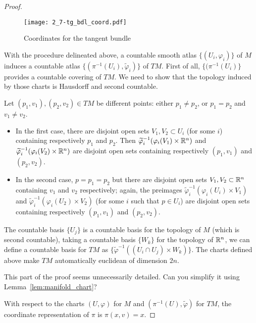 \begin{proof}
  \begin{figure*}[htp]
    \texttt{[image: 2\_7-tg\_bdl\_coord.pdf]}
    \caption{Coordinates for the tangent bundle}
  \end{figure*}
  
  With the procedure delineated above, a countable smooth atlas $\{(U_i, \varphi_i)\}$ of $M$ induces a countable atlas $\{(\pi^{-1}(U_i), \widetilde\varphi_i)\}$ of $TM$.
  First of all, $\{(\pi^{-1}(U_i)\}$ provides a countable covering of $TM$.
  We need to show that the topology induced by those charts is Hausdorff and second countable.
  
  Let $(p_1, v_1), (p_2, v_2) \in TM$ be different points: either $p_1\neq p_2$, or $p_1 = p_2$ and $v_1 \neq v_2$.
  \begin{itemize}
    \item In the first case, there are disjoint open sets $V_1, V_2 \subset U_i$ (for some $i$) containing respectively $p_1$ and $p_2$.
    Then $\widetilde\varphi_i^{-1}(\varphi_i(V_1)\times\mathbb{R}^n)$ and $\widetilde\varphi_i^{-1}(\varphi_i(V_2)\times\mathbb{R}^n)$ are disjoint open sets containing respectively $(p_1, v_1)$ and $(p_2, v_2)$.
    \item In the second case, $p=p_1=p_2$ but there are disjoint open sets $V_1,V_2\subset \mathbb{R}^n$ containing $v_1$ and $v_2$ respectively;
    again, the preimages $\widetilde\varphi_i^{-1}(\varphi_i(U_i)\times V_1)$ and $\widetilde\varphi_i^{-1}(\varphi_i(U_2)\times V_2)$ (for some $i$ such that $p\in U_i$) are disjoint open sets containing respectively $(p_1, v_1)$ and $(p_2, v_2)$.
  \end{itemize}

  The countable basis $\{U_j\}$ is a countable basis for the topology of $M$ (which is second countable), taking a countable basis $\{W_k\}$ for the topology of $\mathbb{R}^n$, we can define a countable basis for $TM$ as $\{\widetilde\varphi^{-1}((U_i\cap U_j)\times W_k)\}$.
  The charts defined above make $TM$ automatically euclidean of dimension $2n$.

  \begin{exercise}
    This part of the proof seems unnecessarily detailed.
    Can you simplify it using Lemma~\ref{lem:manifold_chart}?
  \end{exercise}

   With respect to the charts $(U,\varphi)$ for $M$ and $(\pi^{-1}(U), \widetilde\varphi)$ for $TM$, the coordinate representation of $\pi$ is $\pi(x,v) = x$.
\end{proof}

